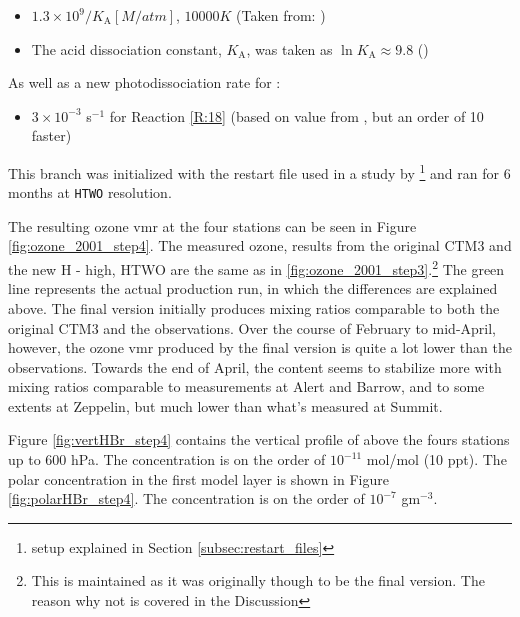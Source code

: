 \begin{itemize}
    \item $1.3\times10^9/K_\text{A} [M/atm]$, $10 000 K$ (Taken from: \cite{Brimblecombe1988TheSA})
    \item The acid dissociation constant, $K_\text{A}$, was taken as $\ln{K_\text{A}} \approx 9.8$ (\cite{Levanov})
\end{itemize}

As well as a new photodissociation rate for :

\begin{itemize}
    \item $3\times10^{-3}$ s$^{-1}$ for Reaction \ref{R:18} (based on value from \cite{CAO}, but an order of 10 faster)
\end{itemize}

This branch was initialized with the restart file used in a study by \cite{Falk_2019}\footnote{setup explained in Section \ref{subsec:restart_files}} and ran for 6 months at \texttt{HTWO} resolution. 

\medskip

The resulting ozone \acrshort{vmr} at the four stations can be seen in Figure \ref{fig:ozone_2001_step4}. The measured ozone, results from the original CTM3 and the new H - high, HTWO are the same as in \ref{fig:ozone_2001_step3}.\footnote{This is maintained as it was originally though to be the final version. The reason why not is covered in the Discussion} The green line represents the actual production run, in which the differences are explained above. The final version initially produces mixing ratios comparable to both the original CTM3 and the observations. Over the course of February to mid-April, however, the ozone \acrshort{vmr} produced by the final version is quite a lot lower than the observations. Towards the end of April, the content seems to stabilize more with mixing ratios comparable to measurements at Alert and Barrow, and to some extents at Zeppelin, but much lower than what's measured at Summit. 



\medskip

Figure \ref{fig:vertHBr_step4} contains the vertical profile of  above the fours stations up to 600 hPa. The concentration is on the order of $10^{-11}$ mol/mol (10 ppt). The polar concentration in the first model layer is shown in Figure \ref{fig:polarHBr_step4}. The concentration is on the order of $10^{-7}$ gm$^{-3}$. 

